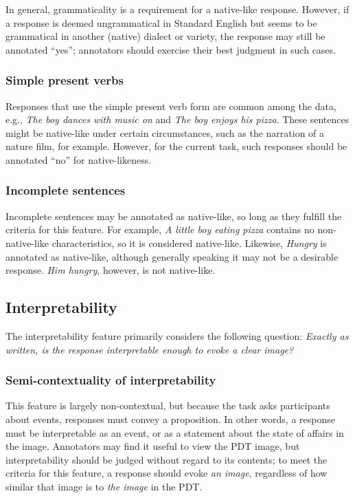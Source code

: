 \documentclass[12pt,notitlepage]{article}
\begin{document}
In general, grammaticality is a requirement for a native-like response. However, if a response is deemed ungrammatical in Standard English but seems to be grammatical in another (native) dialect or variety, the response may still be annotated ``yes''; annotators should exercise their best judgment in such cases.

\subsubsection{Simple present verbs} Responses that use the simple present verb form are common among the data, e.g., \textit{The boy dances with music on} and \textit{The boy enjoys his pizza}. These sentences might be native-like under certain circumstances, such as the narration of a nature film, for example. However, for the current task, such responses should be annotated ``no'' for native-likeness.

\subsubsection{Incomplete sentences} Incomplete sentences may be annotated as native-like, so long as they fulfill the criteria for this feature. For example, \textit{A little boy eating pizza} contains no non-native-like characteristics, so it is considered native-like. Likewise, \textit{Hungry} is annotated as native-like, although generally speaking it may not be a desirable response. \textit{Him hungry}, however, is not native-like.

\subsection{Interpretability} \label{subsec:interpretability}
The interpretability feature primarily considers the following question: \textit{Exactly as written, is the response interpretable enough to evoke a clear image?} 

\subsubsection{Semi-contextuality of interpretability} \label{subsubsec:semicontext-interp} This feature is largely non-contextual, but because the task asks participants about events, responses must convey a proposition. In other words, a response must be interpretable as an event, or as a statement about the state of affairs in the image. Annotators may find it useful to view the PDT image, but interpretability should be judged without regard to its contents; to meet the criteria for this feature, a response should evoke \textit{an image}, regardless of how similar that image is to \textit{the image} in the PDT.
\end{document}
